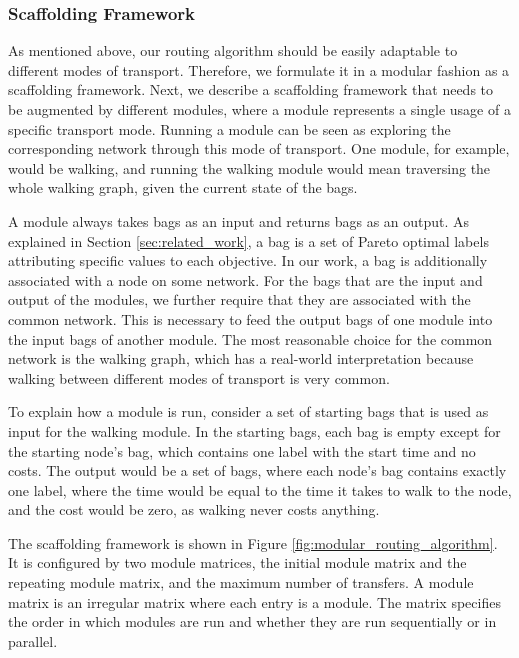 \subsubsection{Scaffolding Framework}
\label{subsubsec:algorithm}

As mentioned above, our routing algorithm should be easily adaptable to different modes of transport. Therefore, we formulate it in a modular fashion as a scaffolding framework.
Next, we describe a scaffolding framework that needs to be augmented by different modules, where a module represents a single usage of a specific transport mode. Running a module can be seen as exploring the corresponding network through this mode of transport.
One module, for example, would be walking, and running the walking module would mean traversing the whole walking graph, given the current state of the bags.

A module always takes bags as an input and returns bags as an output.
As explained in Section \ref{sec:related_work}, a bag is a set of Pareto optimal labels attributing specific values to each objective.
In our work, a bag is additionally associated with a node on some network.
For the bags that are the input and output of the modules, we further require that they are associated with the common network.
This is necessary to feed the output bags of one module into the input bags of another module.
The most reasonable choice for the common network is the walking graph, which has a real-world interpretation because walking between different modes of transport is very common.

To explain how a module is run, consider a set of starting bags that is used as input for the walking module.
In the starting bags, each bag is empty except for the starting node's bag, which contains one label with the start time and no costs.
The output would be a set of bags, where each node's bag contains exactly one label, where the time would be equal to the time it takes to walk to the node, and the cost would be zero, as walking never costs anything.

The scaffolding framework is shown in Figure \ref{fig:modular_routing_algorithm}.
It is configured by two module matrices, the initial module matrix and the repeating module matrix, and the maximum number of transfers.
A module matrix is an irregular matrix where each entry is a module.
The matrix specifies the order in which modules are run and whether they are run sequentially or in parallel.

